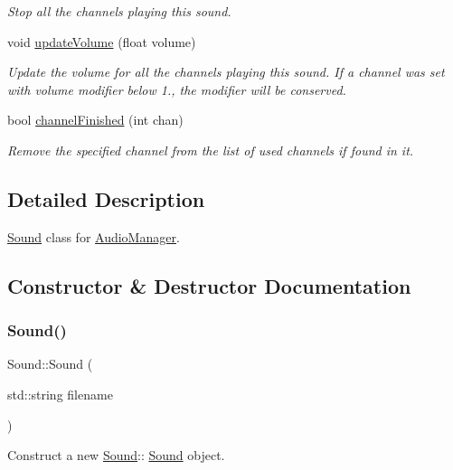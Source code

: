 \begin{DoxyCompactItemize}
\begin{DoxyCompactList}\small\item\em Stop all the channels playing this sound. \end{DoxyCompactList}\item 
void \hyperlink{class_sound_ab992f2602675183484ba78932c1fca3c}{update\+Volume} (float volume)
\begin{DoxyCompactList}\small\item\em Update the volume for all the channels playing this sound. If a channel was set with volume modifier below 1., the modifier will be conserved. \end{DoxyCompactList}\item 
bool \hyperlink{class_sound_a30c16881e13d91d31553af3b17886a5c}{channel\+Finished} (int chan)
\begin{DoxyCompactList}\small\item\em Remove the specified channel from the list of used channels if found in it. \end{DoxyCompactList}\end{DoxyCompactItemize}


\subsection{Detailed Description}
\hyperlink{class_sound}{Sound} class for \hyperlink{class_audio_manager}{Audio\+Manager}. 

\subsection{Constructor \& Destructor Documentation}
\mbox{\label{class_sound_a33747a0bca54f777d0da6f300b8f23f0}} 
\subsubsection{\texorpdfstring{Sound()}{Sound()}}
{\footnotesize\ttfamily Sound\+::\+Sound (\begin{DoxyParamCaption}\item[{std\+::string}]{filename }\end{DoxyParamCaption})\hspace{0.3cm}{\ttfamily [explicit]}}



Construct a new \hyperlink{class_sound}{Sound}\+:\+: \hyperlink{class_sound}{Sound} object. 


